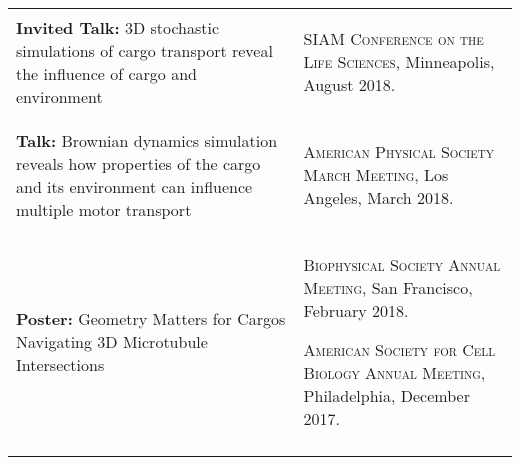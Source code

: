 \documentclass[letterpaper,10pt]{article} %
\makeatletter
\newcommand\cellwidth{\TX@col@width}
\makeatother
\begin{document}
\begin{tabularx}{\textwidth}{p{} | X}
\begin{minipage}{.4\textwidth}
\textbf{Invited Talk:} 3D stochastic simulations of cargo transport reveal the influence of cargo and environment
\end{minipage}
&
\begin{minipage}{\cellwidth}
\begin{description}[itemsep=.25ex,labelsep=0em]
\item \textsc{SIAM Conference on the Life Sciences}, Minneapolis, August 2018.
\end{description}
\end{minipage} \\

\multicolumn{2}{c}{} \\

\begin{minipage}{.4\textwidth}
\textbf{Talk:} Brownian dynamics simulation reveals how properties of the cargo and its environment can influence multiple motor transport
\end{minipage}
&
\begin{minipage}{\cellwidth}
\begin{description}[itemsep=.25ex,labelsep=0em]
\item \textsc{American Physical Society March Meeting}, Los Angeles, March 2018.
\end{description}
\end{minipage} \\

\multicolumn{2}{c}{} \\

\begin{minipage}{.4\textwidth}
\textbf{Poster:} Geometry Matters for Cargos Navigating 3D Microtubule Intersections
\end{minipage}
&
\begin{minipage}{\cellwidth}
\begin{description}[itemsep=.25ex,labelsep=0em]
\item \textsc{Biophysical Society Annual Meeting}, San Francisco, February 2018.
\item \textsc{American Society for Cell Biology Annual Meeting}, Philadelphia, December 2017.
\end{description}
\end{minipage} \\

\multicolumn{2}{c}{} \\


\end{tabularx}
\end{document}
